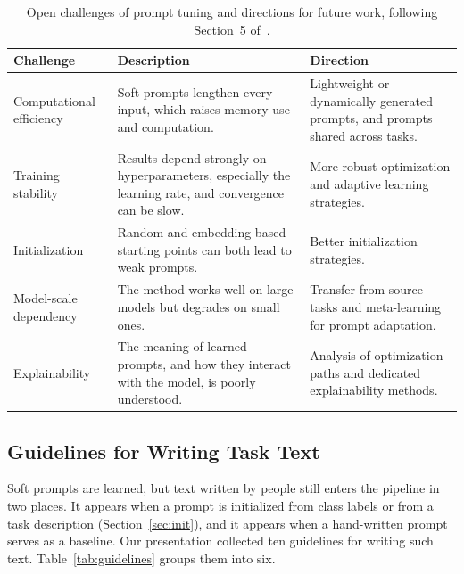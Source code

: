 \documentclass[12pt]{article}
\begin{document}
\begin{table}[htbp]
  \centering
  \caption{Open challenges of prompt tuning and directions for future work, following
    Section~5 of~\cite{li2025survey}.}
  \label{tab:challenges}
  \small
  \begin{tabularx}{\textwidth}{@{}>{\raggedright\arraybackslash}p{2.8cm} L L@{}}
    \toprule
    \textbf{Challenge} & \textbf{Description} & \textbf{Direction}\\
    \midrule
    Computational efficiency & Soft prompts lengthen every input, which raises memory use
      and computation.
      & Lightweight or dynamically generated prompts, and prompts shared across tasks.\\
    Training stability & Results depend strongly on hyperparameters, especially the learning
      rate, and convergence can be slow.
      & More robust optimization and adaptive learning strategies.\\
    Initialization & Random and embedding-based starting points can both lead to weak
      prompts.
      & Better initialization strategies.\\
    Model-scale dependency & The method works well on large models but degrades on small
      ones.
      & Transfer from source tasks and meta-learning for prompt adaptation.\\
    Explainability & The meaning of learned prompts, and how they interact with the model,
      is poorly understood.
      & Analysis of optimization paths and dedicated explainability methods.\\
    \bottomrule
  \end{tabularx}
\end{table}

\subsection{Guidelines for Writing Task Text}\label{sec:guidelines}

Soft prompts are learned, but text written by people still enters the pipeline in two places.
It appears when a prompt is initialized from class labels or from a task description
(Section~\ref{sec:init}), and it appears when a hand-written prompt serves as a baseline. Our
presentation collected ten guidelines for writing such text. Table~\ref{tab:guidelines}
groups them into six.
\end{document}
